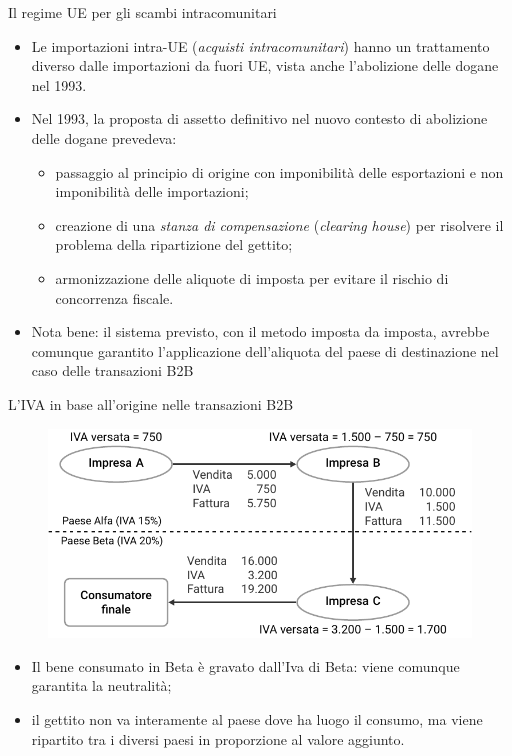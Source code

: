 \documentclass[aspectratio=64,11pt]{beamer}
\begin{document}
\begin{frame}{Il regime UE per gli scambi intracomunitari}

  \begin{itemize}
  \item Le importazioni intra-UE (\emph{acquisti intracomunitari}) hanno un
    trattamento diverso dalle importazioni da fuori UE, vista anche
    l'abolizione delle dogane nel 1993.
  \item Nel 1993, la proposta di assetto definitivo nel nuovo contesto di
    abolizione delle dogane prevedeva:
    \begin{itemize}
    \item passaggio al principio di origine con imponibilità delle
      esportazioni e non imponibilità delle importazioni;
    \item creazione di una \emph{stanza di compensazione} (\emph{clearing
        house}) per risolvere il problema della ripartizione del gettito;
    \item armonizzazione delle aliquote di imposta per evitare il rischio di
      concorrenza fiscale.
    \end{itemize}
  \item Nota bene: il sistema previsto, con il metodo imposta da imposta,
    avrebbe comunque garantito l'applicazione dell'aliquota del paese di
    destinazione nel caso delle transazioni B2B
  \end{itemize}
\end{frame}

\begin{frame}{L'IVA in base all'origine nelle transazioni B2B}
\begin{figure}[htbp]
\centering
\includegraphics[width=.8\textwidth]{./figure/IVA-origine.pdf}
\end{figure}

\begin{itemize}
\item Il bene consumato in Beta è gravato dall'Iva di Beta: viene comunque
  garantita la neutralità;
\item il gettito non va interamente al paese dove ha luogo il consumo, ma
  viene ripartito tra i diversi paesi in proporzione al valore aggiunto.
\end{itemize}
\end{frame}
\end{document}
